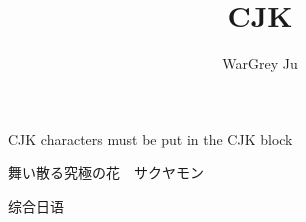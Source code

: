 \documentclass{amsart}
\begin{document}
\title{CJK}
\author{WarGrey Ju}
\maketitle

CJK characters must be put in the CJK block

\begin{CJK}{UTF8}{min}舞い散る究極の花　サクヤモン\end{CJK}

\begin{CJK}{UTF8}{gbsn}综合日语\end{CJK}
\end{document}
